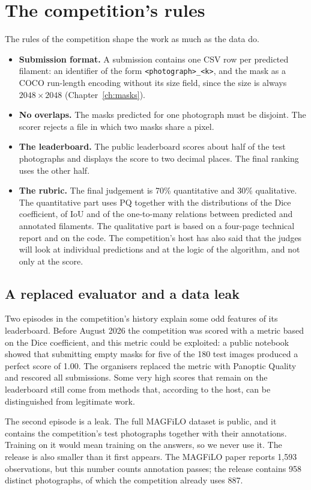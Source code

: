 \section{The competition's rules}\label{sec:data-rules}
The rules of the competition shape the work as much as the data do.
\begin{itemize}[leftmargin=*,itemsep=2pt]
\item \textbf{Submission format.} A submission contains one CSV row per predicted filament: an
identifier of the form \texttt{<photograph>\_<k>}, and the mask as a COCO run-length encoding
without its size field, since the size is always $2048\times2048$ (Chapter~\ref{ch:masks}).
\item \textbf{No overlaps.} The masks predicted for one photograph must be disjoint. The scorer
rejects a file in which two masks share a pixel.
\item \textbf{The leaderboard.} The public leaderboard scores about half of the test photographs
and displays the score to two decimal places. The final ranking uses the other half.
\item \textbf{The rubric.} The final judgement is 70\% quantitative and 30\% qualitative. The
quantitative part uses PQ together with the distributions of the Dice coefficient, of IoU and of
the one-to-many relations between predicted and annotated filaments. The qualitative part is based
on a four-page technical report and on the code. The competition's host has also said that the
judges will look at individual predictions and at the logic of the algorithm, and not only at
the score.
\end{itemize}

\subsection{A replaced evaluator and a data leak}\label{sec:data-history}
Two episodes in the competition's history explain some odd features of its leaderboard. Before
August 2026 the competition was scored with a metric based on the Dice coefficient, and this
metric could be exploited: a public notebook showed that submitting empty masks for five of the
180 test images produced a perfect score of 1.00. The organisers replaced the metric with
Panoptic Quality and rescored all submissions. Some very high scores that remain on the
leaderboard still come from methods that, according to the host, can be distinguished from
legitimate work.

The second episode is a leak. The full MAGFiLO dataset is public, and it contains the
competition's test photographs together with their annotations. Training on it would mean
training on the answers, so we never use it. The release is also smaller than it first appears.
The MAGFiLO paper reports 1,593 observations, but this number counts annotation passes; the
release contains 958 distinct photographs, of which the competition already uses 887.

